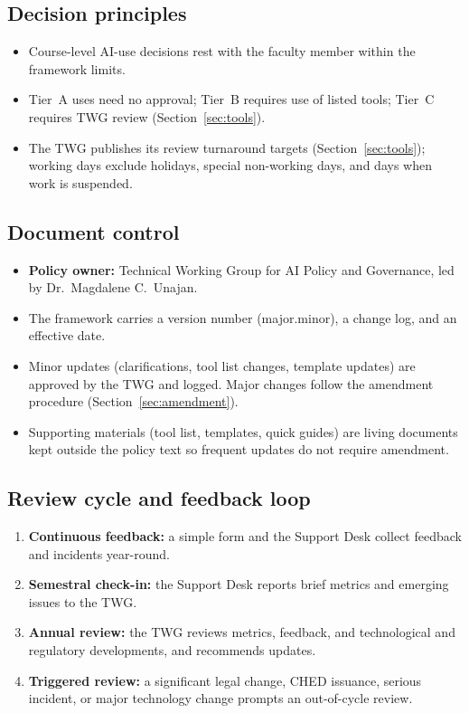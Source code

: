 \subsection{Decision principles}
\begin{itemize}
  \item Course-level AI-use decisions rest with the faculty member within the framework limits.
  \item Tier~A uses need no approval; Tier~B requires use of listed tools;   Tier~C requires TWG review (Section~\ref{sec:tools}).
    \item The TWG publishes its review turnaround targets (Section~\ref{sec:tools}); working days exclude holidays, special non-working days, and days when work is suspended.
\end{itemize}

\subsection{Document control}
\begin{itemize}
  \item \textbf{Policy owner:} Technical Working Group for AI Policy and Governance, led by Dr.\ Magdalene C.\ Unajan.
  \item The framework carries a version number (major.minor), a change log, and an effective date.
  \item Minor updates (clarifications, tool list changes, template updates) are approved by the TWG and logged. Major changes follow the amendment procedure (Section~\ref{sec:amendment}).
  \item Supporting materials (tool list, templates, quick guides) are living documents kept outside the policy text so frequent updates do not require amendment.
\end{itemize}

\subsection{Review cycle and feedback loop}
\begin{enumerate}
  \item \textbf{Continuous feedback:} a simple form and the Support Desk collect feedback and incidents year-round.
  \item \textbf{Semestral check-in:}   the Support Desk reports brief metrics and emerging issues to the TWG.
    \item \textbf{Annual review:} the TWG reviews metrics, feedback, and technological and regulatory developments, and recommends updates.
  \item \textbf{Triggered review:} a significant legal change, CHED issuance, serious incident, or major technology change prompts an out-of-cycle review.
\end{enumerate}
